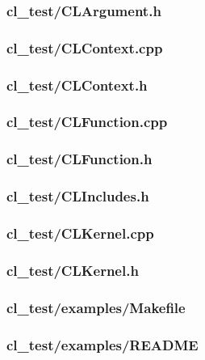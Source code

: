 \documentclass{article}
\begin{document}
\subsubsection*{cl\_test/CLArgument.h}


\subsubsection*{cl\_test/CLContext.cpp}


\subsubsection*{cl\_test/CLContext.h}


\subsubsection*{cl\_test/CLFunction.cpp}


\subsubsection*{cl\_test/CLFunction.h}


\subsubsection*{cl\_test/CLIncludes.h}


\subsubsection*{cl\_test/CLKernel.cpp}


\subsubsection*{cl\_test/CLKernel.h}


\subsubsection*{cl\_test/examples/Makefile}


\subsubsection*{cl\_test/examples/README}

\end{document}
